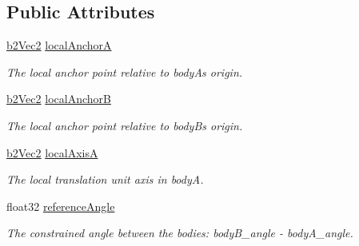 \subsection*{Public Attributes}
\begin{DoxyCompactItemize}
\item 
\mbox{\label{structb2PrismaticJointDef_abb51df8daff7a55f47adc83e4f7fa5b9}} 
\hyperlink{structb2Vec2}{b2\+Vec2} \hyperlink{structb2PrismaticJointDef_abb51df8daff7a55f47adc83e4f7fa5b9}{local\+AnchorA}
\begin{DoxyCompactList}\small\item\em The local anchor point relative to bodyA\textquotesingle{}s origin. \end{DoxyCompactList}\item 
\mbox{\label{structb2PrismaticJointDef_a5acc1f2f14d1b659fc9d804ab1baf4a3}} 
\hyperlink{structb2Vec2}{b2\+Vec2} \hyperlink{structb2PrismaticJointDef_a5acc1f2f14d1b659fc9d804ab1baf4a3}{local\+AnchorB}
\begin{DoxyCompactList}\small\item\em The local anchor point relative to bodyB\textquotesingle{}s origin. \end{DoxyCompactList}\item 
\mbox{\label{structb2PrismaticJointDef_af36fdbcedca5a392a2649cd235c42676}} 
\hyperlink{structb2Vec2}{b2\+Vec2} \hyperlink{structb2PrismaticJointDef_af36fdbcedca5a392a2649cd235c42676}{local\+AxisA}
\begin{DoxyCompactList}\small\item\em The local translation unit axis in bodyA. \end{DoxyCompactList}\item 
\mbox{\label{structb2PrismaticJointDef_aa84b43d08e6e11b4daa0c86f46094463}} 
float32 \hyperlink{structb2PrismaticJointDef_aa84b43d08e6e11b4daa0c86f46094463}{reference\+Angle}
\begin{DoxyCompactList}\small\item\em The constrained angle between the bodies\+: body\+B\+\_\+angle -\/ body\+A\+\_\+angle. \end{DoxyCompactList}\item 
\mbox{\label{structb2PrismaticJointDef_aa61a03b68caac62a5cf66354f6756eae}} 

\end{DoxyCompactItemize}
